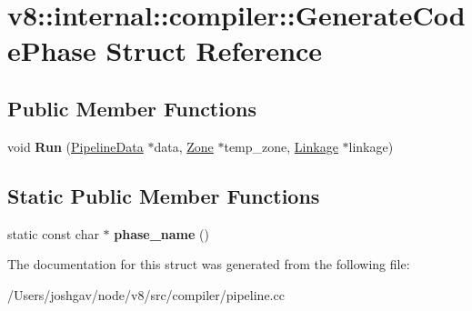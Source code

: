 \hypertarget{structv8_1_1internal_1_1compiler_1_1_generate_code_phase}{}\section{v8\+:\+:internal\+:\+:compiler\+:\+:Generate\+Code\+Phase Struct Reference}
\label{structv8_1_1internal_1_1compiler_1_1_generate_code_phase}
\subsection*{Public Member Functions}
\begin{DoxyCompactItemize}
\item 
void {\bfseries Run} (\hyperlink{classv8_1_1internal_1_1compiler_1_1_pipeline_data}{Pipeline\+Data} $\ast$data, \hyperlink{classv8_1_1internal_1_1_zone}{Zone} $\ast$temp\+\_\+zone, \hyperlink{classv8_1_1internal_1_1compiler_1_1_linkage}{Linkage} $\ast$linkage)\hypertarget{structv8_1_1internal_1_1compiler_1_1_generate_code_phase_af6854b32eafee39c8d2144ee7ecad14c}{}\label{structv8_1_1internal_1_1compiler_1_1_generate_code_phase_af6854b32eafee39c8d2144ee7ecad14c}

\end{DoxyCompactItemize}
\subsection*{Static Public Member Functions}
\begin{DoxyCompactItemize}
\item 
static const char $\ast$ {\bfseries phase\+\_\+name} ()\hypertarget{structv8_1_1internal_1_1compiler_1_1_generate_code_phase_a5d883be20b6a71c9659dd719c2bc3c41}{}\label{structv8_1_1internal_1_1compiler_1_1_generate_code_phase_a5d883be20b6a71c9659dd719c2bc3c41}

\end{DoxyCompactItemize}


The documentation for this struct was generated from the following file\+:\begin{DoxyCompactItemize}
\item 
/\+Users/joshgav/node/v8/src/compiler/pipeline.\+cc\end{DoxyCompactItemize}
